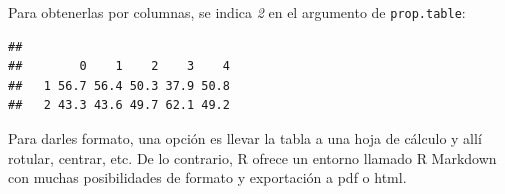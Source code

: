 \documentclass[]{book}
\newenvironment{Shaded}{\begin{snugshade}}{\end{snugshade}}
\newcommand{\DecValTok}[1]{\textcolor[rgb]{0.00,0.00,0.81}{#1}}
\newcommand{\FloatTok}[1]{\textcolor[rgb]{0.00,0.00,0.81}{#1}}
\newcommand{\KeywordTok}[1]{\textcolor[rgb]{0.13,0.29,0.53}{\textbf{#1}}}
\newcommand{\NormalTok}[1]{#1}
\newcommand{\OperatorTok}[1]{\textcolor[rgb]{0.81,0.36,0.00}{\textbf{#1}}}
\newcommand{\StringTok}[1]{\textcolor[rgb]{0.31,0.60,0.02}{#1}}
\begin{document}
Para obtenerlas por columnas, se indica \emph{2} en el argumento de \texttt{prop.table}:

\begin{Shaded}
\end{Shaded}

\begin{verbatim}
##    
##        0    1    2    3    4
##   1 56.7 56.4 50.3 37.9 50.8
##   2 43.3 43.6 49.7 62.1 49.2
\end{verbatim}

Para darles formato, una opción es llevar la tabla a una hoja de cálculo y allí rotular, centrar, etc. De lo contrario, R ofrece un entorno llamado R Markdown con muchas posibilidades de formato y exportación a pdf o html.


\end{document}
